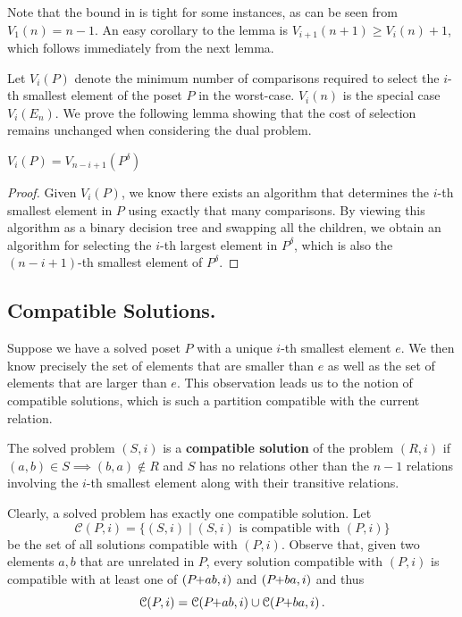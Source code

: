 \documentclass[a4paper,UKenglish,cleveref, autoref, thm-restate]{lipics-v2021}
\newcommand{\pchild}[3]{{#1}\kern-1pt{+}{#2}{#3}}
\newcommand{\dual}[1]{{#1}^{\delta}}
\begin{document}
Note that the bound in  is tight for some instances, as can be seen from $V_1(n) = n - 1$.
An easy corollary to the lemma is $V_{i + 1}(n + 1) \geq V_i(n) + 1$, which follows immediately from the next lemma.

Let $V_i(P)$ denote the minimum number of comparisons required to select the $i$-th smallest element of the poset $P$ in the worst-case.
$V_i(n)$ is the special case $V_i(E_n)$.
We prove the following lemma showing that the cost of selection remains unchanged when considering the dual problem.

\begin{lemma} \label{lemma:dual_poset_allowed}
  $V_i(P) = V_{n - i + 1}(\dual{P})$
\end{lemma}

\begin{proof}
  Given $V_i(P)$, we know there exists an algorithm that determines the $i$-th smallest element in $P$ using exactly that many comparisons.
  By viewing this algorithm as a binary decision tree and swapping all the children, we obtain an algorithm for selecting the $i$-th largest element in $\dual{P}$, which is also the $(n - i + 1)$-th smallest element of $\dual{P}$.
\end{proof}

\subsection{Compatible Solutions.}
Suppose we have a solved poset $P$ with a unique $i$-th smallest element $e$.
We then know precisely the set of elements that are smaller than $e$ as well as the set of elements that are larger than $e$.
This observation leads us to the notion of compatible solutions, which is such a partition compatible with the current relation.

\begin{definition}
  The solved problem $(S, i)$ is a \textbf{compatible solution} of the problem $(R, i)$ if $(a, b) \in S \implies (b, a) \notin R$ and $S$ has no relations other than the $n - 1$ relations involving the $i$-th smallest element along with their transitive relations. 
\end{definition}

Clearly, a solved problem has exactly one compatible solution.
Let
\begin{equation*}
  \mathcal{C}(P, i) = \{(S, i) \mid (S, i) \text{ is compatible with } (P, i)\}
\end{equation*}
be the set of all solutions compatible with $(P, i)$.
Observe that, given two elements $a,b$ that are unrelated in $P$, every solution compatible with $(P, i)$ is compatible with at least one of $(\pchild{P}{a}{b}, i)$ and $(\pchild{P}{b}{a}, i)$ and thus
\begin{equation}\label{lemma:compatible_union}
  \mathcal{C}(P, i) = \mathcal{C}(\pchild{P}{a}{b}, i) \cup \mathcal{C}(\pchild{P}{b}{a}, i)\,\text{.}
\end{equation}
\end{document}
